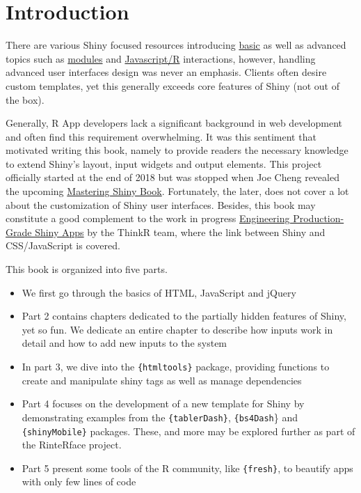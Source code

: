 \documentclass[
]{book}
\providecommand{\tightlist}{%
  \setlength{\itemsep}{0pt}\setlength{\parskip}{0pt}}
\begin{document}
\hypertarget{intro}{%
\chapter{Introduction}\label{intro}}

There are various Shiny focused resources introducing \href{https://shiny.rstudio.com/tutorial/}{basic} as well as advanced topics such as \href{https://shiny.rstudio.com/articles/\#modules}{modules} and \href{https://js4shiny.com}{Javascript/R} interactions, however, handling advanced user interfaces design was never an emphasis. Clients often desire custom templates, yet this generally exceeds core features of Shiny (not out of the box).

Generally, R App developers lack a significant background in web development and often find this requirement overwhelming. It was this sentiment that motivated writing this book, namely to provide readers the necessary knowledge to extend Shiny's layout, input widgets and output elements. This project officially started at the end of 2018 but was stopped when Joe Cheng revealed the upcoming \href{https://mastering-shiny.org}{Mastering Shiny Book}. Fortunately, the later, does not cover a lot about the customization of Shiny user interfaces. Besides, this book may constitute a good complement to the work in progress \href{https://engineering-shiny.org}{Engineering Production-Grade Shiny Apps} by the ThinkR team, where the link between Shiny and CSS/JavaScript is covered.

This book is organized into five parts.

\begin{itemize}
\tightlist
\item
  We first go through the basics of HTML, JavaScript and jQuery
\item
  Part 2 contains chapters dedicated to the partially hidden features of Shiny, yet so fun. We dedicate an entire chapter to describe how inputs work in detail and how to add new inputs to the system
\item
  In part 3, we dive into the \texttt{\{htmltools\}} package, providing functions to create and manipulate shiny tags as well as manage dependencies
\item
  Part 4 focuses on the development of a new template for Shiny by demonstrating examples from the \texttt{\{tablerDash\}}, \texttt{\{bs4Dash}\} and \texttt{\{shinyMobile\}} packages. These, and more may be explored further as part of the RinteRface project.
\item
  Part 5 present some tools of the R community, like \texttt{\{fresh\}}, to beautify apps with only few lines of code
\end{itemize}
\end{document}
